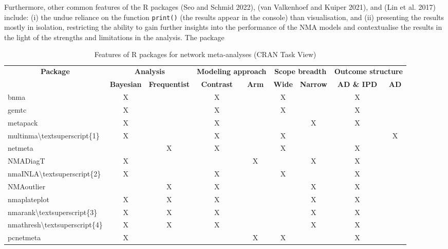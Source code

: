 Furthermore, other common features of the R packages  (Seo and Schmid 2022),
 (van Valkenhoef and Kuiper 2021), and  (Lin et al. 2017) include: (i) the
undue reliance on the function \texttt{print()} (the results appear in the console) than
visualisation, and (ii) presenting the results mostly in isolation, restricting
the ability to gain further insights into the performance of the NMA models and
contextualise the results in the light of the strengths and limitations in the
analysis. The package

\begin{table}

\caption{\label{tab:table-one}Features of R packages for network meta-analyses (CRAN Task View)}
\centering
\fontsize{7}{9}\selectfont
\begin{tabular}[t]{l|c|c|c|c|c|c|c|c}
\hline
\multicolumn{1}{c|}{\textbf{Package}} & \multicolumn{2}{c|}{\textbf{Analysis}} & \multicolumn{2}{c|}{\textbf{Modeling approach}} & \multicolumn{2}{c|}{\textbf{Scope breadth}} & \multicolumn{2}{c}{\textbf{Outcome structure}} \\
\cline{1-1} \cline{2-3} \cline{4-5} \cline{6-7} \cline{8-9}
\textbf{} & \textbf{Bayesian} & \textbf{Frequentist} & \textbf{Contrast} & \textbf{Arm} & \textbf{Wide} & \textbf{Narrow} & \textbf{AD \& IPD} & \textbf{AD}\\
\hline
bnma & X &  & X &  & X &  & X & \\
\hline
gemtc & X &  & X &  & X &  & X & \\
\hline
metapack & X &  & X &  &  & X & X & \\
\hline
multinma\textbackslash{}textsuperscript\{1\} & X &  & X &  & X &  &  & X\\
\hline
netmeta &  & X & X &  & X &  & X & \\
\hline
NMADiagT & X &  &  & X &  & X & X & \\
\hline
nmaINLA\textbackslash{}textsuperscript\{2\} & X &  & X &  & X &  & X & \\
\hline
NMAoutlier &  & X & X &  &  & X & X & \\
\hline
nmaplateplot & X & X & X &  &  & X & X & \\
\hline
nmarank\textbackslash{}textsuperscript\{3\} & X & X & X &  &  & X & X & \\
\hline
nmathresh\textbackslash{}textsuperscript\{4\} & X & X & X &  &  & X & X & \\
\hline
pcnetmeta & X &  &  & X & X &  & X & \\

\end{tabular}
\end{table}
